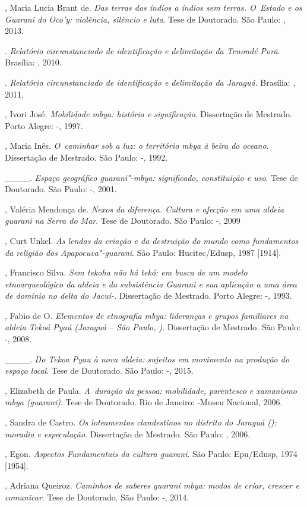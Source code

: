 \begin{Parskip}
, Maria Lucia Brant de. \emph{Das terras dos índios a índios sem
terras. O~Estado e os Guarani do Oco’y: violência, silêncio e luta}.
Tese de Doutorado. São Paulo: , 2013.

. \emph{Relatório circunstanciado de identificação e delimitação da 
Tenondé Porã}. Brasília: , 2010.

. \emph{Relatório circunstanciado de identificação e delimitação da 
Jaraguá}. Brasília: , 2011.

, Ivori José. \emph{Mobilidade mbya: história e significação}.
Dissertação de Mestrado. Porto Alegre: -, 1997.

, Maria Inês. \emph{O~caminhar sob a luz: o território mbya à beira do
oceano}. Dissertação de Mestrado. São Paulo: -, 1992. 

\_\_\_\_. \emph{Espaço geográfico guarani"-mbya: significado, constituição e
uso}. Tese de Doutorado. São Paulo: -, 2001.

, Valéria Mendonça de. \emph{Nexos da diferença. Cultura e afecção em
uma aldeia guarani na Serra do Mar}. Tese de Doutorado. São Paulo:
-, 2009

, Curt Unkel. \emph{As lendas da criação e da destruição do mundo
como fundamentos da religião dos Apapocuva"-guarani}. São Paulo:
Hucitec/Edusp, 1987 [1914].

, Francisco Silva. \emph{Sem tekoha não há tekó: em busca de um modelo
etnoarqueológico da aldeia e da subsistência Guarani e sua aplicação a
uma área de domínio no delta do Jacuí-}. Dissertação de Mestrado.
Porto Alegre: -, 1993.

  , Fabio de O. \emph{Elementos de etnografia mbya: lideranças
e grupos familiares na aldeia Tekoá Pyaú (Jaraguá – São Paulo, )}.
Dissertação de Mestrado. São Paulo: -, 2008.

\_\_\_\_. \emph{Do Tekoa Pyau à nova aldeia: sujeitos em movimento na produção do
espaço local}. Tese de Doutorado. São Paulo: -, 2015.

, Elizabeth de Paula. \emph{A~duração da pessoa: mobilidade,
parentesco e xamanismo mbya (guarani)}. Tese de Doutorado. Rio de
Janeiro: -Museu Nacional, 2006. 

, Sandra de Castro. \emph{Os loteamentos clandestinos no distrito do
Jaraguá (): moradia e especulação}. Dissertação de Mestrado. São
Paulo: , 2006.

, Egon. \emph{Aspectos Fundamentais da cultura guarani}. São Paulo:
Epu/Edusp, 1974 [1954].

, Adriana Queiroz. \emph{Caminhos de saberes guarani mbya: modos de
criar, crescer e comunicar}. Tese de Doutorado. São Paulo: -,
2014.
\end{Parskip}

